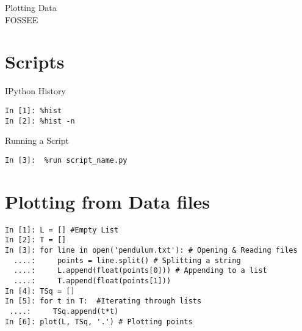 \documentclass[12pt]{article}
\begin{document}
\date{}
\vspace{-1in}
\begin{center}
\LARGE{Plotting Data}\\
\large{FOSSEE}
\end{center}
\section{Scripts}
IPython History
\begin{verbatim}
In [1]: %hist
In [2]: %hist -n
\end{verbatim}

Running a Script
\begin{verbatim}
In [3]:  %run script_name.py
\end{verbatim}

\section{Plotting from Data files}
\begin{verbatim}
In [1]: L = [] #Empty List
In [2]: T = []
In [3]: for line in open('pendulum.txt'): # Opening & Reading files
  ....:     points = line.split() # Splitting a string
  ....:     L.append(float(points[0])) # Appending to a list
  ....:     T.append(float(points[1]))
In [4]: TSq = []
In [5]: for t in T:  #Iterating through lists
 ....:     TSq.append(t*t)
In [6]: plot(L, TSq, '.') # Plotting points
\end{verbatim}
\end{document}
